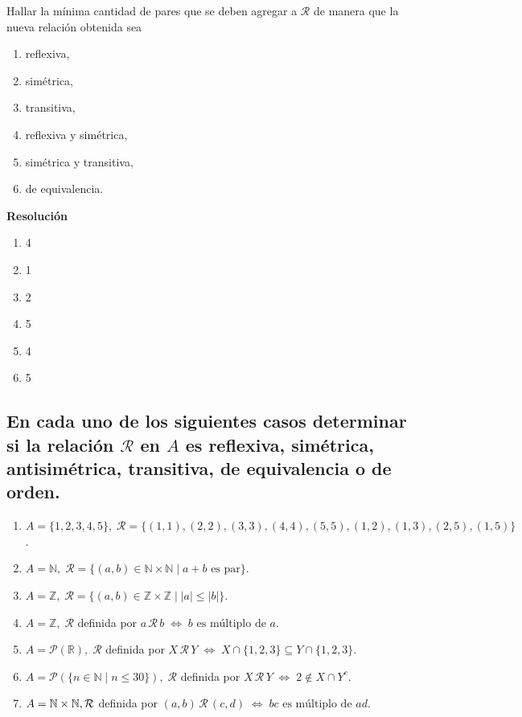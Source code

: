 \documentclass[11pt]{article}
\begin{document}
Hallar la mínima cantidad de pares que se deben agregar a $\mathcal{R}$ de manera que la nueva relación obtenida sea

\begin{enumerate}[label=\roman*)]
    \item reflexiva,
    \item simétrica,
    \item transitiva,
    \item reflexiva y simétrica,
    \item simétrica y transitiva,
    \item de equivalencia.
\end{enumerate}

\textbf{Resolución}

\begin{enumerate}[label=\roman*)]
    \item 4
    \item 1
    \item 2
    \item 5
    \item 4
    \item 5
\end{enumerate}

\subsection{En cada uno de los siguientes casos determinar si la relación $\mathcal{R}$ en $A$ es reflexiva, simétrica, antisimétrica, transitiva, de equivalencia o de orden.}

\begin{enumerate}[label=\roman*)]
    \item $A = \{1,2,3,4,5\}, \;
    \mathcal{R} = \{(1,1),(2,2),(3,3),(4,4),(5,5),(1,2),(1,3),(2,5),(1,5)\}$.

    \item $A = \mathbb{N}, \;
    \mathcal{R} = \{(a,b)\in \mathbb{N}\times\mathbb{N} \mid a+b \text{ es par}\}$.

    \item $A = \mathbb{Z}, \;
    \mathcal{R} = \{(a,b)\in \mathbb{Z}\times\mathbb{Z} \mid |a|\leq |b|\}$.

    \item $A = \mathbb{Z}, \;
    \mathcal{R}$ definida por $a \,\mathcal{R}\, b \;\Leftrightarrow\; b \text{ es múltiplo de } a$.

    \item $A = \mathcal{P}(\mathbb{R}), \;
    \mathcal{R}$ definida por $X \,\mathcal{R}\, Y \;\Leftrightarrow\; X\cap\{1,2,3\} \subseteq Y\cap\{1,2,3\}$.

    \item $A = \mathcal{P}(\{n\in\mathbb{N}\mid n\leq 30\}), \;
    \mathcal{R}$ definida por $X \,\mathcal{R}\, Y \;\Leftrightarrow\; 2\notin X \cap Y^c$.

    \item $A = \mathbb{N}\times\mathbb{N}, \;\\
    \mathcal{R}$ definida por $(a,b)\,\mathcal{R}\,(c,d) \;\Leftrightarrow\; bc \text{ es múltiplo de } ad$.
\end{enumerate}
\end{document}
